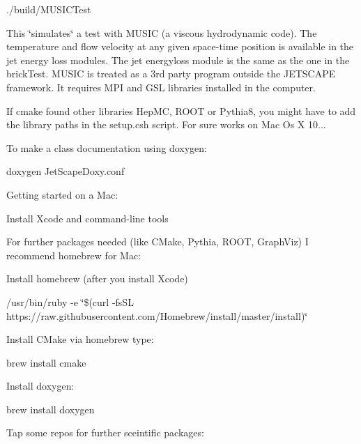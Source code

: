 \begin{DoxyCode}
./build/MUSICTest
\end{DoxyCode}


This \char`\"{}simulates\char`\"{} a test with M\+U\+S\+IC (a viscous hydrodynamic code). The temperature and flow velocity at any given space-\/time position is available in the jet energy loss modules. The jet energyloss module is the same as the one in the brick\+Test. M\+U\+S\+IC is treated as a 3rd party program outside the J\+E\+T\+S\+C\+A\+PE framework. It requires M\+PI and G\+SL libraries installed in the computer.

If cmake found other libraries Hep\+MC, R\+O\+OT or Pythia8, you might have to add the library path\textquotesingle{}s in the setup.\+csh script. For sure works on Mac Os X 10...

To make a class documentation using doxygen\+:

doxygen Jet\+Scape\+Doxy.\+conf

Getting started on a Mac\+:


\begin{DoxyItemize}
\item Install Xcode and command-\/line tools
\end{DoxyItemize}

For further packages needed (like C\+Make, Pythia, R\+O\+OT, Graph\+Viz) I recommend homebrew for Mac\+:


\begin{DoxyItemize}
\item Install homebrew (after you install Xcode)
\end{DoxyItemize}

/usr/bin/ruby -\/e \char`\"{}\$(curl -\/fs\+S\+L https\+://raw.\+githubusercontent.\+com/\+Homebrew/install/master/install)\char`\"{}


\begin{DoxyItemize}
\item Install C\+Make via homebrew type\+:
\end{DoxyItemize}

brew install cmake


\begin{DoxyItemize}
\item Install doxygen\+:
\end{DoxyItemize}

brew install doxygen


\begin{DoxyItemize}
\item Tap some repos for further sceintific packages\+:
\end{DoxyItemize}

